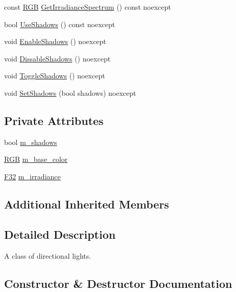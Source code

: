 \begin{DoxyCompactItemize}
\item 
const \hyperlink{structmage_1_1_r_g_b}{R\+GB} \hyperlink{classmage_1_1rendering_1_1_directional_light_a3a99d3d63a686f8bc587015115a85a81}{Get\+Irradiance\+Spectrum} () const noexcept
\item 
bool \hyperlink{classmage_1_1rendering_1_1_directional_light_a129904147256d111ec56cc3ddc502157}{Use\+Shadows} () const noexcept
\item 
void \hyperlink{classmage_1_1rendering_1_1_directional_light_abafdec9ce9ca0263724ce8ddba430b1b}{Enable\+Shadows} () noexcept
\item 
void \hyperlink{classmage_1_1rendering_1_1_directional_light_a7b0b25df35d2c1121bf08cb0a733b858}{Dissable\+Shadows} () noexcept
\item 
void \hyperlink{classmage_1_1rendering_1_1_directional_light_a34a939e192e857ac25f6d91dd773ec9b}{Toggle\+Shadows} () noexcept
\item 
void \hyperlink{classmage_1_1rendering_1_1_directional_light_a4a8aa135c9366993f6343b33cd4ed9e0}{Set\+Shadows} (bool shadows) noexcept
\end{DoxyCompactItemize}
\subsection*{Private Attributes}
\begin{DoxyCompactItemize}
\item 
bool \hyperlink{classmage_1_1rendering_1_1_directional_light_a64fa40ef9f9d0ae8a0856aabd44f0cae}{m\+\_\+shadows}
\item 
\hyperlink{structmage_1_1_r_g_b}{R\+GB} \hyperlink{classmage_1_1rendering_1_1_directional_light_a55d415fffd8f59f296e4d380639d3af1}{m\+\_\+base\+\_\+color}
\item 
\hyperlink{namespacemage_aa97e833b45f06d60a0a9c4fc22ae02c0}{F32} \hyperlink{classmage_1_1rendering_1_1_directional_light_a72b58bf80a9f40934622aee9f68aa545}{m\+\_\+irradiance}
\end{DoxyCompactItemize}
\subsection*{Additional Inherited Members}


\subsection{Detailed Description}
A class of directional lights. 

\subsection{Constructor \& Destructor Documentation}
\hypertarget{classmage_1_1rendering_1_1_directional_light_a5a8c05a640ec86f4d1994d687de6415f}{}\label{classmage_1_1rendering_1_1_directional_light_a5a8c05a640ec86f4d1994d687de6415f} 

